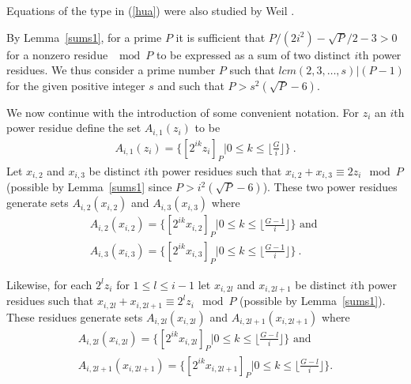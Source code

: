 Equations of the type in (\ref{hua}) were also studied by Weil
\cite{weil:49}.



By Lemma~\ref{sums1}, for a prime $P$ it is sufficient that
$P/(2i^2)-\sqrt{P}/2-3>0$ for a nonzero residue $\mod P$ to be
expressed as a sum of two distinct $i$th power residues. We thus
consider a prime number $P$ such that $lcm(2,3,\dots,s)|(P-1)$ for
the given positive integer $s$ and such that $P>s^2(\sqrt{P}-6)$.

We now continue with the introduction of some convenient notation.
For $z_i$ an $i$th power residue define the set $A_{i,1}(z_i)$ to
be
\begin{eqnarray}\label{azi1}A_{i,1}(z_i)=\{[2^{ik}z_i]_P | 0 \leq k \leq
\lfloor\frac{G}{i} \rfloor \}~.\end{eqnarray} Let $x_{i,2}$ and
$x_{i,3}$ be distinct $i$th power residues such that
$x_{i,2}+x_{i,3} \equiv 2z_i \mod P$ (possible by
Lemma~\ref{sums1} since $P>i^2(\sqrt{P}-6)$). These two power
residues generate sets $A_{i,2}(x_{i,2})$ and  $A_{i,3}(x_{i,3})$
where
\begin{eqnarray}\label{azi2} A_{i,2}(x_{i,2}) =\{ [2^{ik}x_{i,2}]_P| 0 \leq k \leq \lfloor
\frac{G-1}{i} \rfloor \} \text{ and }\\
\label{azi3}A_{i,3}(x_{i,3}) =\{ [2^{ik}x_{i,3}]_P| 0 \leq k \leq
\lfloor \frac{G-1}{i} \rfloor \}~.\end{eqnarray}

Likewise, for each $2^lz_i$ for $1 \leq l \leq i-1$ let $x_{i,2l}$
and $x_{i,2l+1}$ be distinct $i$th power residues such that
$x_{i,2l} + x_{i,2l+1} \equiv 2^lz_i \mod P$ (possible by
Lemma~\ref{sums1}). These residues generate sets
$A_{i,2l}(x_{i,2l})$ and  $A_{i,2l+1}(x_{i,2l+1})$ where
\begin{eqnarray}\label{azi2l}
A_{i,2l}(x_{i,2l}) =\{ [2^{ik}x_{i,2l}]_P| 0 \leq k \leq \lfloor
\frac{G-l}{i} \rfloor \} \text{ and }\\
\label{azi2la}A_{i,2l+1}(x_{i,2l+1}) =\{ [2^{ik}x_{i,2l+1}]_P| 0
\leq k \leq \lfloor \frac{G-l}{i} \rfloor \}.\end{eqnarray}

